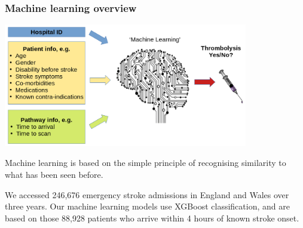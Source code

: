 \begin{frame}
\frametitle{Machine learning overview}
\begin{center}
\includegraphics[width=0.80\textwidth]{./images/ml_model_high_level}
\end{center}

\small
Machine learning is based on the simple principle of recognising similarity to what has been seen before.
\vspace{3mm}

We accessed 246,676 emergency stroke admissions in England and Wales over three years. Our machine learning models use XGBoost classification, and are based on those 88,928 patients who arrive within 4 hours of known stroke onset. 
\end{frame}